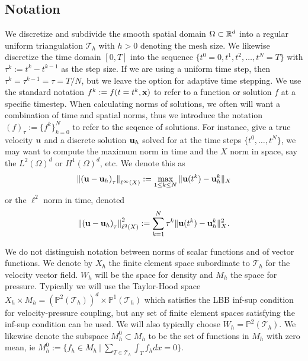 \documentclass[letterpaper]{erdc}
\begin{document}
\subsection{Notation}
We discretize and subdivide the smooth spatial domain $\Omega\subset \mathbb{R}^d$ into a regular uniform triangulation $\mathcal{T}_h$ with $h>0$ denoting the mesh size.  We likewise discretize the time domain $[0,T]$ into the sequence $\{ t^0=0, t^1, t^2, \dots, t^N = T\}$  with $\tau^k:= t^k-t^{k-1}$ as the step size.  If we are using a uniform time step, then $\tau^k = \tau^{k-1} = \tau = T/N$, but we leave the option for adaptive time stepping.  We use the standard notation $f^{k} := f(t=t^k,\textbf{x})$ to refer to a function or solution $f$ at a specific timestep.  When calculating norms of solutions, we often will want a combination of time and spatial norms,  thus we introduce the notation $\left( f \right)_{\tau}:= \{ f^k \}_{k=0}^{N}$ to refer to the seqence of solutions.  For instance, give a true velocity $\textbf{u}$ and a discrete solution $\textbf{u}_h$ solved for at the time steps $\{t^0,\dots, t^{N}\}$, we may want to compute the maximum norm in time and the $X$ norm in space, say the $L^2(\Omega)^d$ or $H^1(\Omega)^d$, etc.  We denote this as
\begin{equation}
  \left\| \left( \textbf{u} - \textbf{u}_h \right)_{\tau} \right\|_{\ell^{\infty}(X)} := \max_{1\leq k \leq N} \| \textbf{u}(t^{k}) - \textbf{u}_h^{k}\|_{X}
\end{equation}
or the $\ell^2$ norm in time, denoted
\begin{equation}
  \left\| \left( \textbf{u} - \textbf{u}_h \right)_{\tau} \right\|^2_{\ell^{2}(X)} :=  \sum_{k=1}^{N} \tau^{k}\| \textbf{u}(t^{k}) - \textbf{u}_h^{k}\|^2_{X}.
\end{equation}

We do not distinguish notation between norms of scalar functions and of vector functions.  We denote by $X_h$ the finite element space subordinate to $\mathcal{T}_h$ for the velocity vector field.  $W_h$ will be the space for density and $M_h$ the space for pressure.  Typically we will use the Taylor-Hood space $X_h \times M_h = \left(\mathbb{P}^2\left(\mathcal{T}_h\right)\right)^d\times \mathbb{P}^1\left(\mathcal{T}_h\right)$ which satisfies the LBB inf-sup condition for velocity-pressure coupling, but any set of finite element spaces satisfying the inf-sup condition can be used.  We will also typically choose $W_h = \mathbb{P}^2\left(\mathcal{T}_h\right)$.  We likewise denote the subspace $M_h^0\subset M_h$ to be the set of functions in $M_h$ with zero mean, ie $M_h^0 := \{ f_h\in M_h \:|\: \sum_{T\in\mathcal{T}_h}\int_{T}f_h dx = 0\}$.
\end{document}
